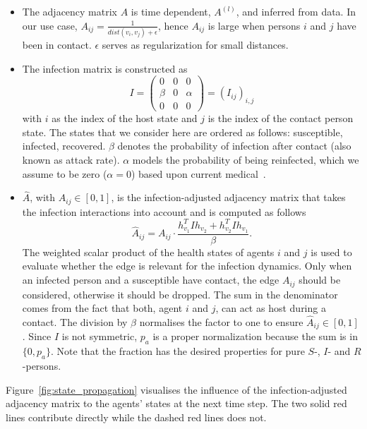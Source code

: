 \begin{itemize}
	\item The adjacency matrix $A$ is time dependent, $A^{(l)}$, and inferred from data. In our use case, $A_{ij} = \frac{1}{dist(v_i, v_j)+\epsilon}$, hence $A_{ij}$ is large when persons $i$ and $j$ have been in contact. $\epsilon$ serves as regularization for small distances.
	\item The infection matrix is constructed as
	\begin{equation}
	I =
	\begin{pmatrix}
	0     &  0  & 0 \\
	\beta &  0  & \alpha \\
	0     &  0  & 0
	\end{pmatrix}
	=
	{(I_{ij})}_{i,j}
	\end{equation}
	with $i$ as the index of the host state and $j$ is the index of the contact person state. The states that we consider here are ordered as follows: susceptible, infected, recovered. $\beta$ denotes the probability of infection  after contact (also known as attack rate). $\alpha$ models the probability of being reinfected, which we assume to be zero ($\alpha=0$) based upon current medical~\cite{Bao2020.03.13.990226}.
	\item $\hat{A}$, with $\hat{A}_{ij}\in [0, 1]$, is the infection-adjusted adjacency matrix that takes the infection interactions into account and is computed as follows
	\begin{equation}
	\hat{A}_{ij} = A_{ij}\cdot \frac{ h_{v_1}^T I h_{v_2} + h_{v_2}^T I h_{v_1} }{\beta}.
	\end{equation}
	The weighted scalar product of the health states of agents $i$ and $j$ is used to evaluate whether the edge is relevant for the infection dynamics. Only when an infected person and a susceptible have contact, the edge $A_{ij}$ should be considered, otherwise it should be dropped.	The sum in the denominator comes from the fact that both, agent $i$ and $j$, can act as host during a contact. The division by $\beta$ normalises the factor to one to ensure $\hat{A}_{ij} \in [0, 1]$. Since $I$ is not symmetric, $p_a$ is a proper normalization because the sum is in $\{0, p_a\}$. Note that the fraction has the desired properties for pure $S$-, $I$- and $R$-persons.
\end{itemize}

Figure~\ref{fig:state_propagation} visualises the influence of the infection-adjusted adjacency matrix to the agents' states at the next time step. The two solid red lines contribute directly while the dashed red lines does not.

